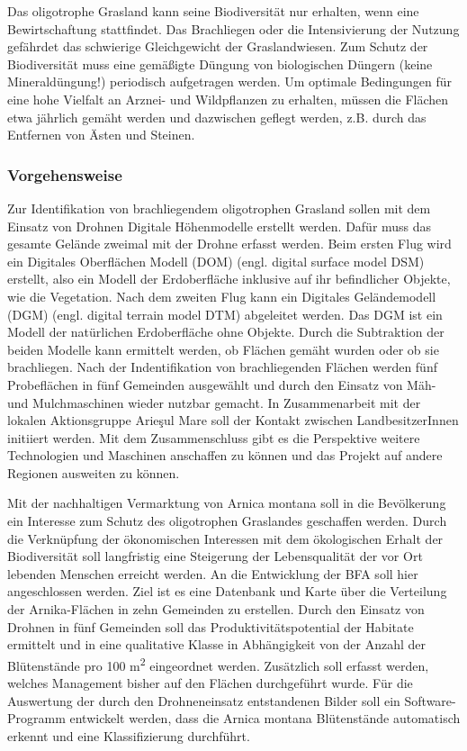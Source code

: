 Das oligotrophe Grasland kann seine Biodiversität nur erhalten, wenn eine Bewirtschaftung stattfindet. Das Brachliegen oder die Intensivierung der Nutzung gefährdet das schwierige Gleichgewicht der Graslandwiesen. Zum Schutz der Biodiversität muss eine gemäßigte Düngung von biologischen Düngern (keine Mineraldüngung!) periodisch aufgetragen werden. Um optimale Bedingungen für eine hohe Vielfalt an Arznei- und Wildpflanzen zu erhalten, müssen die Flächen etwa jährlich gemäht werden und dazwischen geflegt werden, z.B. durch das Entfernen von Ästen und Steinen.


\subsubsection{Vorgehensweise}

Zur Identifikation von brachliegendem oligotrophen Grasland sollen mit dem Einsatz von Drohnen Digitale Höhenmodelle erstellt werden. Dafür muss das gesamte Gelände zweimal mit der Drohne erfasst werden. Beim ersten Flug wird ein Digitales Oberflächen Modell (DOM) (engl. digital surface model DSM) erstellt, also ein Modell der Erdoberfläche inklusive auf ihr befindlicher Objekte, wie die Vegetation. Nach dem zweiten Flug kann ein Digitales Geländemodell (DGM) (engl. digital terrain model DTM) abgeleitet werden. Das DGM ist ein Modell der natürlichen Erdoberfläche ohne Objekte. Durch die Subtraktion der beiden Modelle kann ermittelt werden, ob Flächen gemäht wurden oder ob sie brachliegen. Nach der Indentifikation von brachliegenden Flächen werden fünf Probeflächen in fünf Gemeinden ausgewählt und durch den Einsatz von Mäh- und Mulchmaschinen wieder nutzbar gemacht. In Zusammenarbeit mit der lokalen Aktionsgruppe Arieşul Mare soll der Kontakt zwischen LandbesitzerInnen initiiert werden. Mit dem Zusammenschluss gibt es die Perspektive weitere Technologien und Maschinen anschaffen zu können und das Projekt auf andere Regionen ausweiten zu können.

Mit der nachhaltigen Vermarktung von Arnica montana soll in die Bevölkerung ein Interesse zum Schutz des oligotrophen Graslandes geschaffen werden. Durch die Verknüpfung der ökonomischen Interessen mit dem ökologischen Erhalt der Biodiversität soll langfristig eine Steigerung der Lebensqualität der vor Ort lebenden Menschen erreicht werden. An die Entwicklung der BFA soll hier angeschlossen werden. Ziel ist es eine Datenbank und Karte über die Verteilung der Arnika-Flächen in zehn Gemeinden zu erstellen. Durch den Einsatz von Drohnen in fünf Gemeinden soll das Produktivitätspotential der Habitate ermittelt und in eine qualitative Klasse in Abhängigkeit von der Anzahl der Blütenstände pro 100 m\textsuperscript{2} eingeordnet werden. Zusätzlich soll erfasst werden, welches Management bisher auf den Flächen durchgeführt wurde. Für die Auswertung der durch den Drohneneinsatz entstandenen Bilder soll ein Software-Programm entwickelt werden, dass die Arnica montana Blütenstände automatisch erkennt und eine Klassifizierung durchführt.

